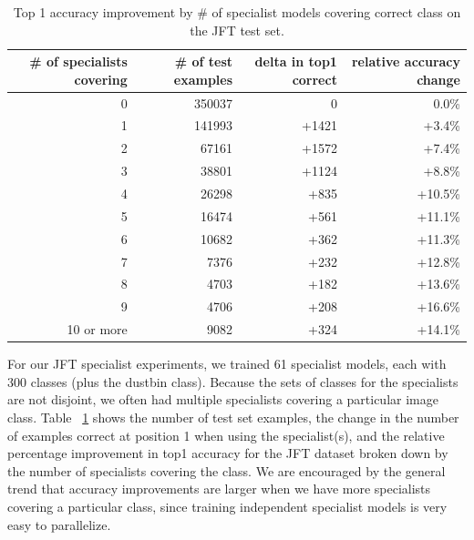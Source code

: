 \begin{table}
\centering
\small
\begin{tabular}{|r|r|r|r|}
\hline
\# of specialists covering & \# of test examples & delta in top1 correct &
relative accuracy change \\
\hline
  0 &  350037 &      0 & 0.0\% \\
  1 &  141993 &  +1421 & +3.4\% \\
  2 &   67161 &  +1572 & +7.4\% \\
  3 &   38801 &  +1124 & +8.8\% \\
  4 &   26298 &   +835 & +10.5\% \\
  5 &   16474 &   +561 & +11.1\% \\
  6 &   10682 &   +362 & +11.3\% \\
  7 &    7376 &   +232 & +12.8\% \\
  8 &    4703 &   +182 & +13.6\% \\
  9 &    4706 &   +208 & +16.6\% \\
 10 or more &    9082 &   +324 & +14.1\% \\
\hline
\end{tabular}
\caption{Top 1 accuracy improvement by \# of specialist models covering
correct class on the JFT test set.}\label{tab:jft_specialists_histogram}
\end{table}

For our JFT specialist experiments, we trained 61 specialist models, each with 300 classes (plus the dustbin class).
Because the sets of classes for the specialists are not disjoint, we often had multiple specialists covering a
particular image class.  Table ~\ref{tab:jft_specialists_histogram} shows the number of test set examples, the change in
the number of examples correct at position 1 when using the specialist(s), and the relative percentage improvement in
top1 accuracy for the JFT dataset broken down by the number of specialists covering the class.  We are encouraged by the
general trend that accuracy improvements are larger when we have more specialists covering a particular class, since
training independent specialist models is very easy to parallelize.
